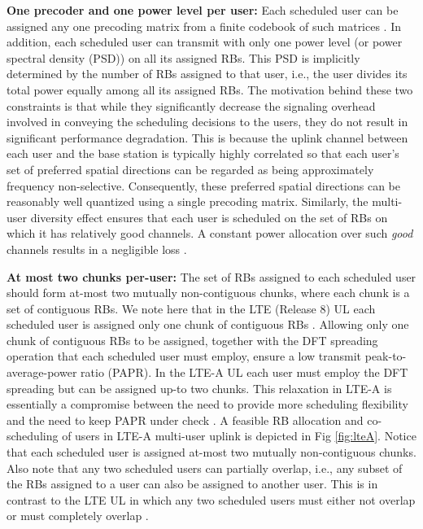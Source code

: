 \documentclass[11pt] {article}
\begin{document}
 \textbf{One precoder and one power level per user:} Each scheduled user can be assigned any one precoding matrix from a finite codebook of such matrices  . In addition, each scheduled user can transmit with only one power level (or power spectral density (PSD))  on all its assigned RBs. This PSD is implicitly determined by the number of RBs assigned to that user, i.e., the user divides its total power equally among all its assigned RBs. The motivation behind these two constraints is that while they significantly decrease the signaling overhead involved in conveying the scheduling decisions to the users, they do not result in significant performance degradation. This is because the uplink channel between each user and the base station is typically highly correlated so that each user's set of preferred spatial directions can be regarded as being approximately frequency non-selective. Consequently, these preferred spatial directions can be reasonably well quantized using a single precoding matrix. Similarly,
    the multi-user diversity effect ensures that each user is scheduled on the set of RBs on which it has relatively good channels. A constant power allocation over such {\em good} channels results in a negligible loss \cite{YuW:Constant}.


  \textbf{At most two chunks per-user:} The set of RBs assigned to each scheduled user should form at-most two mutually non-contiguous chunks, where each chunk is a set of contiguous RBs.  We note here that in the LTE (Release 8) UL each scheduled user is assigned only one  chunk of contiguous RBs \cite{3gpp:rel8}.  Allowing only one chunk of contiguous  RBs to be assigned, together with the DFT spreading operation that each scheduled user must   employ, ensure a low transmit peak-to-average-power ratio (PAPR). In the LTE-A UL each user must employ the DFT spreading but can be assigned up-to two chunks. This relaxation in LTE-A is essentially a compromise between the need to provide more scheduling flexibility and the need to keep PAPR under check \cite{3gpp}.
  A feasible RB allocation and co-scheduling of users in  LTE-A multi-user uplink  is depicted in Fig \ref{fig:lteA}. Notice that each scheduled user is assigned at-most two mutually non-contiguous chunks. Also note that any two scheduled users can partially overlap, i.e., any subset  of the RBs assigned to a user can also be assigned to another user. This is in contrast to the LTE  UL in which any two scheduled users must either not overlap or must completely overlap \cite{3gpp:rel8}.
\end{document}
